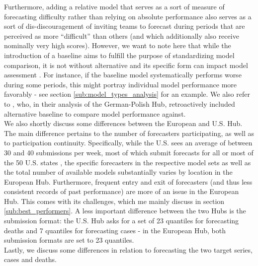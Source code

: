 Furthermore, adding a relative model that serves as a sort of measure of forecasting difficulty rather than relying on absolute performance also serves as a sort of dis-discouragement of inviting teams to forecast during periods that are perceived as more ``difficult'' than others (and which additionally also receive nominally very high scores). However, we want to note here that while the introduction of a baseline aims to fulfill the purpose of standardizing model comparison, it is not without alternative and its specific form can imp{}act model assessment \citep{sherratt_predictive_2022}. For instance, if the baseline model systematically performs worse during some periods, this might portray individual model performance more favorably - see section \ref{sub:model_types_analysis} for an example. We also refer to \cite{bracher_pre-registered_2021}, who, in their analysis of the German-Polish Hub, retroactively included alternative baseline to compare model performance against.\\
We also shortly discuss some differences between the European and U.S. Hub. The main difference pertains to the number of forecasters participating, as well as to participation continuity. Specifically, while the U.S. sees an average of between 30 and 40 submissions per week, most of which submit forecasts for all or most of the 50 U.S. states \citep{ray_comparing_2022}, the specific forecasters in the respective model sets as well as the total number of available models substantially varies by location in the European Hub. Furthermore, frequent entry and exit of forecasters (and thus less consistent records of past performance) are more of an issue in the European Hub. This comes with its challenges, which me mainly discuss in section \ref{sub:best_performers}. A less important difference between the two Hubs is the submission format: the U.S. Hub asks for a set of 23 quantiles for forecasting deaths and 7 quantiles for forecasting cases - in the European Hub, both submission formats are set to 23 quantiles.\\
Lastly, we discuss some differences in relation to forecasting the two target series, cases and deaths.\\
